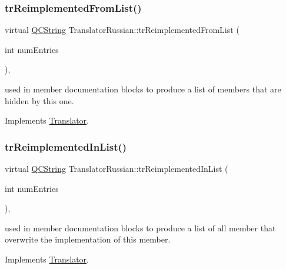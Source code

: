 \subsubsection{\texorpdfstring{trReimplementedFromList()}{trReimplementedFromList()}}
{\footnotesize\ttfamily virtual \mbox{\hyperlink{class_q_c_string}{Q\+C\+String}} Translator\+Russian\+::tr\+Reimplemented\+From\+List (\begin{DoxyParamCaption}\item[{int}]{num\+Entries }\end{DoxyParamCaption})\hspace{0.3cm}{\ttfamily [inline]}, {\ttfamily [virtual]}}

used in member documentation blocks to produce a list of members that are hidden by this one. 

Implements \mbox{\hyperlink{class_translator}{Translator}}.

\mbox{\label{class_translator_russian_a48591622af07dcdb65c5078d16b154a6}} 
\subsubsection{\texorpdfstring{trReimplementedInList()}{trReimplementedInList()}}
{\footnotesize\ttfamily virtual \mbox{\hyperlink{class_q_c_string}{Q\+C\+String}} Translator\+Russian\+::tr\+Reimplemented\+In\+List (\begin{DoxyParamCaption}\item[{int}]{num\+Entries }\end{DoxyParamCaption})\hspace{0.3cm}{\ttfamily [inline]}, {\ttfamily [virtual]}}

used in member documentation blocks to produce a list of all member that overwrite the implementation of this member. 

Implements \mbox{\hyperlink{class_translator}{Translator}}.

\mbox{\label{class_translator_russian_a47f4d123da2a58220a7e86a1e64c6bc3}} 
